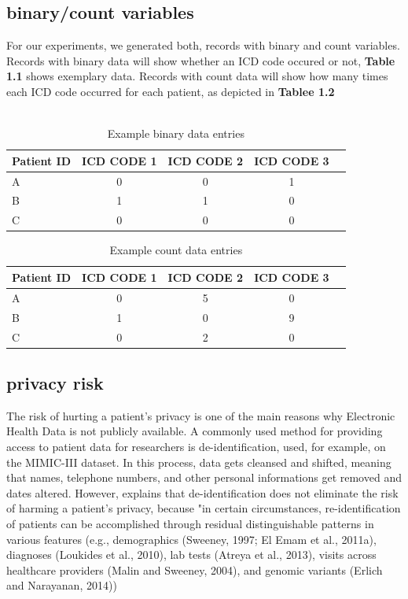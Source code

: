 \documentclass[11pt, a4paper]{book}
\begin{document}
\subsection{binary/count variables}
For our experiments, we generated both, records with binary and count variables. Records with binary data will show whether an ICD code occured or not, \textbf{Table 1.1} shows exemplary data. Records with count data will show how many times each ICD code occurred for each patient, as depicted in \textbf{Tablee 1.2}
\\
\\

\begin{table}
\begin{center}
\begin{tabular}{l*{3}{c}r }
Patient ID & ICD CODE 1 & ICD CODE 2 & ICD CODE 3 \\
\hline
A & 0 & 0 & 1 \\
B & 1 & 1 & 0 \\
C & 0 & 0 & 0 \\
\hline
\end{tabular}
\caption{Example binary data entries}
\end{center}
\end{table}


\begin{table}
\begin{center}
\begin{tabular}{l*{3}{c}r }
Patient ID & ICD CODE 1 & ICD CODE 2 & ICD CODE 3 \\
\hline
A & 0 & 5 & 0 \\
B & 1 & 0 & 9 \\
C & 0 & 2 & 0 \\
\hline
\end{tabular}
\caption{Example count data entries}
\end{center}
\end{table}

\subsection{privacy risk}
The risk of hurting a patient's privacy is one of the main reasons why Electronic Health Data is not publicly available. A commonly used method for providing access to patient data for researchers is de-identification, used, for example, on the MIMIC-III dataset. In this process, data gets cleansed and shifted, meaning that names, telephone numbers, and other personal informations get removed and dates altered. \cite{johnson2016mimic}
However, \cite{Choi2017} explains that de-identification does not eliminate the risk of harming a patient's privacy, because "in certain circumstances, re-identification of patients can be accomplished through residual distinguishable patterns in various features (e.g., demographics (Sweeney, 1997; El Emam et al., 2011a), diagnoses (Loukides et al., 2010), lab tests (Atreya et al., 2013), visits across healthcare providers (Malin and Sweeney, 2004), and genomic variants (Erlich and Narayanan, 2014)) \cite{Choi2017}
\end{document}
